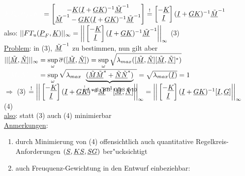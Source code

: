 \documentclass[openany,a4paper,11pt]{book}
\begin{document}
${\color{white}FT_u(\uline{P}_F,\uline{K})}=\begin{bmatrix}-\uline{K}(\uline{I}+\uline{GK})^{-1}\uline{\tilde{M}}^{-1}\\\uline{\tilde{M}}^{-1}-\uline{GK}(\uline{I}+\uline{GK})^{-1}\uline{\tilde{M}}^{-1}\end{bmatrix}\stackrel{!}{=}\begin{bmatrix}-\uline{K}\\\uline{I}\end{bmatrix}(\uline{I}+\uline{GK})^{-1}\uline{\tilde{M}}^{-1}$\\
also: $||FT_u(\uline{P}_F,\uline{K})||_\infty=\bigg|\bigg|\begin{bmatrix}-\uline{K}\\\uline{I}\end{bmatrix}(\uline{I}+\uline{GK})^{-1}\uline{\tilde{M}}^{-1}\bigg|\bigg|_\infty$ \quad (3)\\
\uline{Problem}: in (3), $\uline{\tilde{M}}^{-1}$ zu bestimmen, nun gilt aber\\
$||[\uline{\tilde{M}}, \uline{\tilde{N}}]||_\infty=\mathop{\text{sup}}\limits_{\omega}\overline{\sigma}([\uline{\tilde{M}}, \uline{\tilde{N}}])=\mathop{\text{sup}}\limits_{\omega}\sqrt{\lambda_{max}([\uline{\tilde{M}}, \uline{\tilde{N}}][\uline{\tilde{M}}, \uline{\tilde{N}}]^*)}$\\ 
${\color{white}||[\uline{\tilde{M}}, \uline{\tilde{N}}]||_\infty}=\mathop{\text{sup}}\limits_{\omega}\sqrt{\smash[b]{\lambda_{max}\underbrace{(\uline{\tilde{M}}\uline{\tilde{M}}^*+\uline{\tilde{N}}\uline{\tilde{N}}^*)}_{\stackrel{!}{=}\uline{I} \text{ vgl. BB. ORS 2-10}}}}=\sqrt{\lambda_{max}(\uline{I})}=1$\\[12pt]
$\Rightarrow$ (3) $\stackrel{!}{=}\bigg|\bigg|\begin{bmatrix}-\uline{K}\\\uline{I}\end{bmatrix}(\uline{I}+\uline{GK})^{-1}\uline{\tilde{M}}^{-1}[\uline{\tilde{M}}, \uline{\tilde{N}}]\bigg|\bigg|_\infty=\bigg|\bigg|\begin{bmatrix}-\uline{K}\\\uline{I}\end{bmatrix}(\uline{I}+\uline{GK})^{-1}[\uline{I},\uline{G}]\bigg|\bigg|_\infty$ \quad (4)\\
\uline{also}: statt (3) auch (4) minimierbar\\
\uline{Anmerkungen}:\begin{enumerate}
    \item durch Minimierung von (4) offensichtlich auch quantitative Regelkreis-Anforderungen $(\uline{S}, \uline{KS}, \uline{SG})$ ber"ucksichtigt
    \item auch Freuquenz-Gewichtung in den Entwurf einbeziehbar: 
\end{enumerate}
\end{document}
